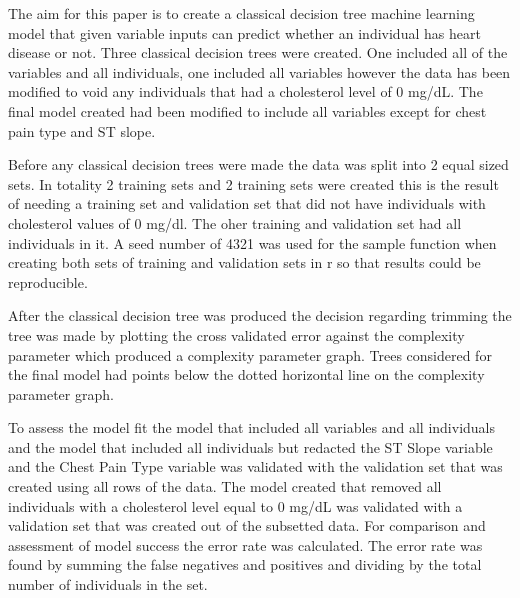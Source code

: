 \documentclass[12pt]{article}
\begin{document}
The aim for this paper is to create a classical decision tree machine learning model that given variable inputs can predict whether an individual has heart disease or not.
Three classical decision trees were created. One included all of the variables and all individuals, one included all variables however the data has been modified to void any individuals that had a cholesterol level of 0 mg/dL. The final model created had been modified to include all variables except for chest pain type and ST slope. \par
Before any classical decision trees were made the data was split into 2 equal sized sets. In totality 2 training sets and 2 training sets were created this is the result of needing a training set and validation set that did not have individuals with cholesterol values of 0 mg/dl. The oher training and validation set had all individuals in it. A seed number of 4321 was used for the sample function when creating both sets of training and validation sets in r so that results could be reproducible. \par
After the classical decision tree was produced the decision regarding trimming the tree was made by plotting the cross validated error against the complexity parameter which produced a complexity parameter graph. Trees considered for the final model had points below the dotted horizontal line on the complexity parameter graph. \par
To assess the model fit the model that included all variables and all individuals and the model that included all individuals but redacted the ST Slope variable and the Chest Pain Type variable was validated with the validation set that was created using all rows of the data. The model created that removed all individuals with a cholesterol level equal to 0 mg/dL was validated with a validation set that was created out of the subsetted data. For comparison and assessment of model success the error rate was calculated.  The error rate was found by summing the false negatives and positives and dividing by the total number of individuals in the set.  \par
\end{document}
